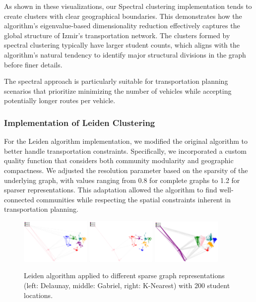 As shown in these visualizations, our Spectral clustering implementation tends to create clusters with clear geographical boundaries. This demonstrates how the algorithm's eigenvalue-based dimensionality reduction effectively captures the global structure of Izmir's transportation network. The clusters formed by spectral clustering typically have larger student counts, which aligns with the algorithm's natural tendency to identify major structural divisions in the graph before finer details.

The spectral approach is particularly suitable for transportation planning scenarios that prioritize minimizing the number of vehicles while accepting potentially longer routes per vehicle.

\subsubsection{Implementation of Leiden Clustering}
\label{subsubsec:leiden_implementation}

For the Leiden algorithm implementation, we modified the original algorithm to better handle transportation constraints. Specifically, we incorporated a custom quality function that considers both community modularity and geographic compactness. We adjusted the resolution parameter based on the sparsity of the underlying graph, with values ranging from 0.8 for complete graphs to 1.2 for sparser representations. This adaptation allowed the algorithm to find well-connected communities while respecting the spatial constraints inherent in transportation planning.

\begin{figure}[htbp]
\centering
\includegraphics[width=0.3\textwidth]{./img/Leiden_Delaunay}
\hspace{0.2cm}
\includegraphics[width=0.3\textwidth]{./img/Leiden_Gabriel}
\hspace{0.2cm}
\includegraphics[width=0.3\textwidth]{./img/Leiden_K}

\caption{Leiden algorithm applied to different sparse graph representations (left: Delaunay, middle: Gabriel, right: K-Nearest) with 200 student locations.}
\label{fig:leiden_clustering}
\end{figure}

